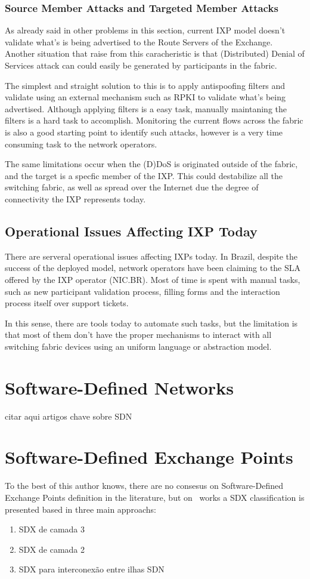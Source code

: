 \subsubsection{Source Member Attacks and Targeted Member Attacks}
As already said in other problems in this section, current IXP model doesn't validate what's is being advertised to the Route Servers of the Exchange. Another situation that raise from this caracheristic is that (Distributed) Denial of Services attack can could easily be generated by participants in the fabric. 

The simplest and straight solution to this is to apply antispoofing filters and validate using an external mechanism such as RPKI to validate what's being advertised. Although applying filters is a easy task, manually maintaning the filters is a hard task to accomplish. Monitoring the current flows across the fabric is also a good starting point to identify such attacks, however is a very time consuming task to the network operators.

The same limitations occur when the (D)DoS is originated outside of the fabric, and the target is a specfic member of the IXP. This could destabilize all the switching fabric, as well as spread over the Internet due the degree of connectivity the IXP represents today.

\subsection{Operational Issues Affecting IXP Today}
There are serveral operational issues affecting IXPs today. In Brazil, despite the success of the deployed model, network operators have been claiming to the SLA offered by the IXP operator (NIC.BR). Most of time is spent with manual tasks, such as new participant validation process, filling forms and the interaction process itself over support tickets.

In this sense, there are tools today to automate such tasks, but the limitation is that most of them don't have the proper mechanisms to interact with all switching fabric devices using an uniform language or abstraction model.

\section{Software-Defined Networks}
citar aqui artigos chave sobre SDN

\section{Software-Defined Exchange Points}
To the best of this author knows, there are no consesus on Software-Defined Exchange Points definition in the literature, but on~\cite{chungatlanticwave} works a SDX classification is presented based in three main approachs:
\begin{enumerate}
\item SDX de camada 3
\item SDX de camada 2
\item SDX para interconexão entre ilhas SDN
\end{enumerate}

